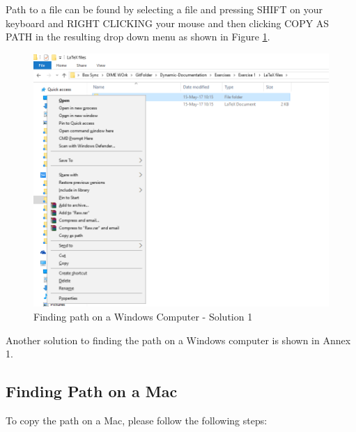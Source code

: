 \documentclass[]{article}
\begin{document}
Path to a file can be found by selecting a file and pressing {\color{red}SHIFT on your keyboard and RIGHT CLICKING your mouse and then clicking COPY AS PATH in the resulting drop down menu} as shown in Figure \ref{fig:pathwin3}.

\begin{figure}[H]
	\centering
	\includegraphics[width=0.9\linewidth]{img/pathwin3}
	\caption{Finding path on a Windows Computer - Solution 1}
	\label{fig:pathwin3}
\end{figure}


Another solution to finding the path on a Windows computer is shown in Annex 1.
	
\subsection*{Finding Path on a Mac}

To copy the path on a Mac, please follow the following steps: 
\end{document}

